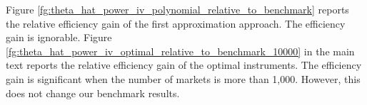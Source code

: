 \documentclass[11pt, a4paper]{article}
\begin{document}


Figure \ref{fg:theta_hat_power_iv_polynomial_relative_to_benchmark} reports the relative efficiency gain of the first approximation approach. 
The efficiency gain is ignorable.
Figure \ref{fg:theta_hat_power_iv_optimal_relative_to_benchmark_10000} in the main text reports the relative efficiency gain of the optimal instruments. 
The efficiency gain is significant when the number of markets is more than 1,000. 
However, this does not change our benchmark results.
\end{document}
